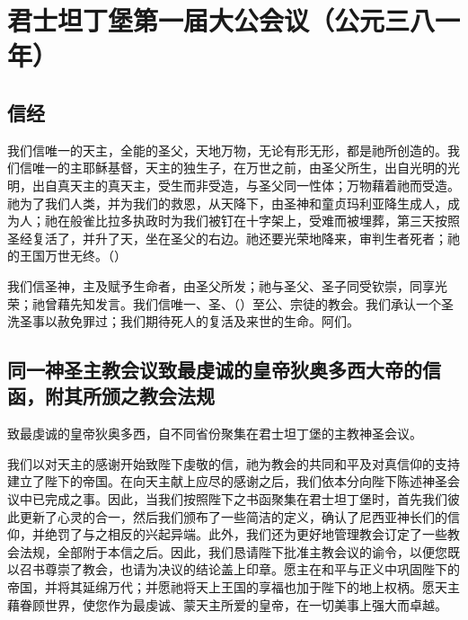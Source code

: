 
\chapter{君士坦丁堡第一届大公会议（公元三八一年）}



\section{信经}

我们信唯一的天主，全能的圣父，天地万物，无论有形无形，都是祂所创造的。我们信唯一的主耶稣基督，天主的独生子，在万世之前，由圣父所生，出自光明的光明，出自真天主的真天主，受生而非受造，与圣父同一性体；万物藉着祂而受造。祂为了我们人类，并为我们的救恩，从天降下，由圣神和童贞玛利亚降生成人，成为人；祂在般雀比拉多执政时为我们被钉在十字架上，受难而被埋葬，第三天按照圣经复活了，并升了天，坐在圣父的右边。祂还要光荣地降来，审判生者死者；祂的王国万世无终。（）\par

我们信圣神，主及赋予生命者，由圣父所发；祂与圣父、圣子同受钦崇，同享光荣；祂曾藉先知发言。我们信唯一、圣、（）至公、宗徒的教会。我们承认一个圣洗圣事以赦免罪过；我们期待死人的复活及来世的生命。阿们。\par


\section{同一神圣主教会议致最虔诚的皇帝狄奥多西大帝的信函，附其所颁之教会法规}

致最虔诚的皇帝狄奥多西，自不同省份聚集在君士坦丁堡的主教神圣会议。\par

我们以对天主的感谢开始致陛下虔敬的信，祂为教会的共同和平及对真信仰的支持建立了陛下的帝国。在向天主献上应尽的感谢之后，我们依本分向陛下陈述神圣会议中已完成之事。因此，当我们按照陛下之书函聚集在君士坦丁堡时，首先我们彼此更新了心灵的合一，然后我们颁布了一些简洁的定义，确认了尼西亚神长们的信仰，并绝罚了与之相反的兴起异端。此外，我们还为更好地管理教会订定了一些教会法规，全部附于本信之后。因此，我们恳请陛下批准主教会议的谕令，以便您既以召书尊崇了教会，也请为决议的结论盖上印章。愿主在和平与正义中巩固陛下的帝国，并将其延绵万代；并愿祂将天上王国的享福也加于陛下的地上权柄。愿天主藉眷顾世界，使您作为最虔诚、蒙天主所爱的皇帝，在一切美事上强大而卓越。\par

